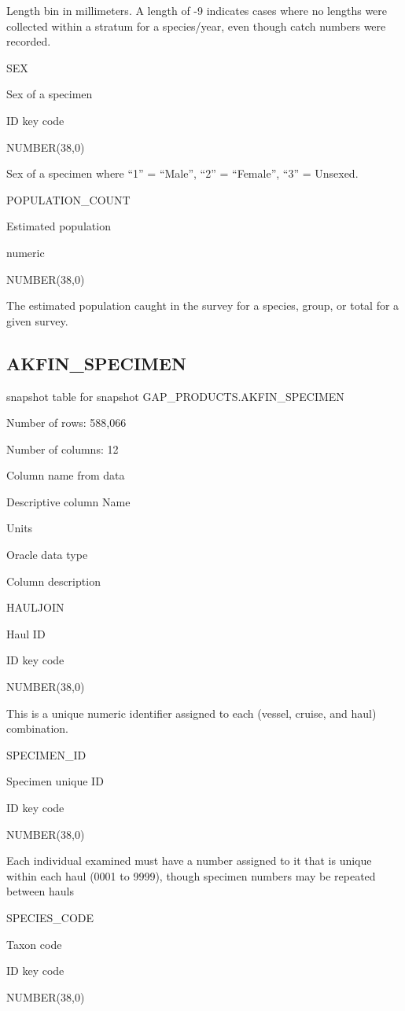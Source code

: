 \documentclass[
  letterpaper,
  oneside,
  open=any]{scrbook}
\begin{document}
Length bin in millimeters. A length of -9 indicates cases where no
lengths were collected within a stratum for a species/year, even though
catch numbers were recorded.

SEX

Sex of a specimen

ID key code

NUMBER(38,0)

Sex of a specimen where ``1'' = ``Male'', ``2'' = ``Female'', ``3'' =
Unsexed.

POPULATION\_COUNT

Estimated population

numeric

NUMBER(38,0)

The estimated population caught in the survey for a species, group, or
total for a given survey.

\subsection{AKFIN\_SPECIMEN}\label{akfin_specimen}

snapshot table for snapshot GAP\_PRODUCTS.AKFIN\_SPECIMEN

Number of rows: 588,066

Number of columns: 12

Column name from data

Descriptive column Name

Units

Oracle data type

Column description

HAULJOIN

Haul ID

ID key code

NUMBER(38,0)

This is a unique numeric identifier assigned to each (vessel, cruise,
and haul) combination.

SPECIMEN\_ID

Specimen unique ID

ID key code

NUMBER(38,0)

Each individual examined must have a number assigned to it that is
unique within each haul (0001 to 9999), though specimen numbers may be
repeated between hauls

SPECIES\_CODE

Taxon code

ID key code

NUMBER(38,0)
\end{document}

